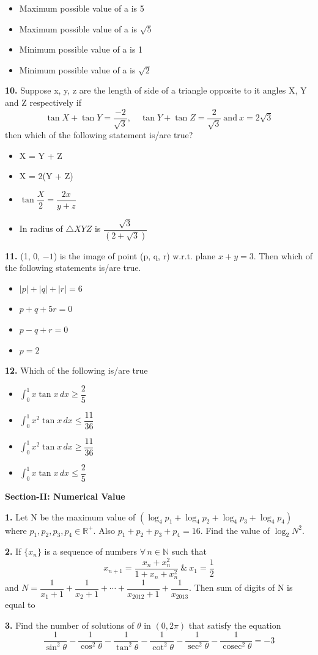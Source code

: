 \documentclass[10pt,twocolumn]{extarticle}
\newenvironment{qoptions}{\begin{itemize}[leftmargin=1.8em,itemsep=2pt,topsep=2pt,label={}]}{\end{itemize}}
\newcommand{\opt}[2]{\item[({#1})] {#2}}
\newcommand{\subsectionhdr}[1]{\par\vspace{3pt}\noindent\textbf{#1}\par\vspace{2pt}}
\begin{document}
\begin{qoptions}
\opt{A}{Maximum possible value of a is 5}
\opt{B}{Maximum possible value of a is $\sqrt5$}
\opt{C}{Minimum possible value of a is 1}
\opt{D}{Minimum possible value of a is $\sqrt2$}
\end{qoptions}

\textbf{10.} Suppose x, y, z are the length of side of a triangle opposite to it angles X, Y and Z respectively if
\[\tan X+\tan Y=\dfrac{-2}{\sqrt3},\quad \tan Y+\tan Z=\dfrac{2}{\sqrt3}\ \text{and}\ x=2\sqrt3\]
then which of the following statement is/are true?

\begin{qoptions}
\opt{A}{X = Y + Z}
\opt{B}{X = 2(Y + Z)}
\opt{C}{$\tan\dfrac{X}{2}=\dfrac{2x}{y+z}$}
\opt{D}{In radius of $\triangle XYZ$ is $\dfrac{\sqrt3}{\left(2+\sqrt3\right)}$}
\end{qoptions}

\textbf{11.} (1, 0, $-1$) is the image of point (p, q, r) w.r.t. plane $x+y=3$. Then which of the following statements is/are true.

\begin{qoptions}
\opt{A}{$|p|+|q|+|r|=6$}
\opt{B}{$p+q+5r=0$}
\opt{C}{$p-q+r=0$}
\opt{D}{$p=2$}
\end{qoptions}

\textbf{12.} Which of the following is/are true

\begin{qoptions}
\opt{A}{$\displaystyle\int_0^1 x\tan x\,dx\ge\dfrac25$}
\opt{B}{$\displaystyle\int_0^1 x^2\tan x\,dx\le\dfrac{11}{36}$}
\opt{C}{$\displaystyle\int_0^1 x^2\tan x\,dx\ge\dfrac{11}{36}$}
\opt{D}{$\displaystyle\int_0^1 x\tan x\,dx\le\dfrac25$}
\end{qoptions}

\subsectionhdr{Section-II: Numerical Value}

\textbf{1.} Let N be the maximum value of $(\log_4p_1+\log_4p_2+\log_4p_3+\log_4p_4)$ where $p_1,p_2,p_3,p_4\in\mathbb{R}^+$. Also $p_1+p_2+p_3+p_4=16$. Find the value of $\log_2N^2$.

\textbf{2.} If $\{x_n\}$ is a sequence of numbers $\forall\, n\in\mathbb{N}$ such that
\[x_{n+1}=\dfrac{x_n+x_n^2}{1+x_n+x_n^2}\ \&\ x_1=\dfrac12\]
and $\displaystyle N=\dfrac{1}{x_1+1}+\dfrac{1}{x_2+1}+\cdots+\dfrac{1}{x_{2012}+1}+\dfrac{1}{x_{2013}}$.
Then sum of digits of N is equal to

\textbf{3.} Find the number of solutions of $\theta$ in $(0,2\pi)$ that satisfy the equation
\[\dfrac{1}{\sin^2\theta}-\dfrac{1}{\cos^2\theta}-\dfrac{1}{\tan^2\theta}-\dfrac{1}{\cot^2\theta}-\dfrac{1}{\sec^2\theta}-\dfrac{1}{\operatorname{cosec}^2\theta}=-3\]
\end{document}
